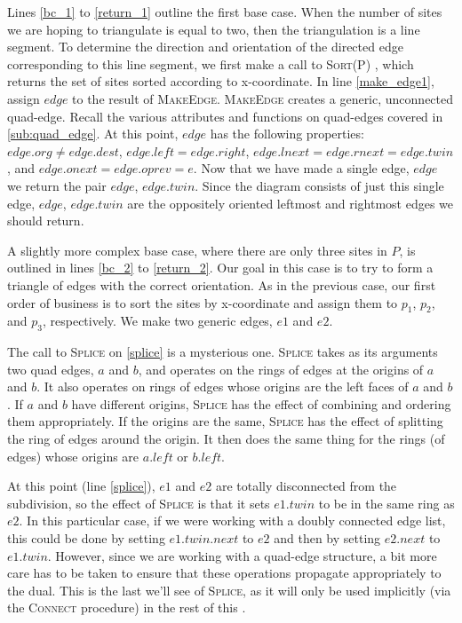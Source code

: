 \documentclass[12pt,twoside]{reedthesis}
\begin{document}
    Lines \ref{bc_1} to \ref{return_1} outline the first base case. When the number of sites we are hoping to triangulate is equal to two, then the triangulation is a line segment. To determine the direction and orientation of the directed edge corresponding to this line segment, we first make a call to \textsc{Sort}(P) , which returns the set of sites sorted according to x-coordinate. In line \ref{make_edge1}, assign $edge$ to the result of \textsc{MakeEdge}. \textsc{MakeEdge} creates a generic, unconnected quad-edge. Recall the various attributes and functions on quad-edges covered in \cref{sub:quad_edge}. At this point, $edge$ has the following properties: $edge.org \neq edge.dest$, $edge.left = edge.right$, $edge.lnext = edge.rnext = edge.twin$, and $edge.onext = edge.oprev = e$. Now that we have made a single edge, $edge$ we return the pair $edge$, $edge.twin$. Since the diagram consists of just this single edge, $edge$, $edge.twin$ are the oppositely oriented leftmost and rightmost edges we should return.

    A slightly more complex base case, where there are only three sites in $P$, is outlined in lines \ref{bc_2} to \ref{return_2}. Our goal in this case is to try to form a triangle of edges with the correct orientation.  As in the previous case, our first order of business is to sort the sites by x-coordinate and assign them to $p_{1}$, $p_{2}$, and $p_{3}$, respectively. We make two generic edges, $e1$ and $e2$. \par

    The call to \textsc{Splice} on \ref{splice} is a mysterious one. \textsc{Splice} takes as its arguments two quad edges, $a$ and $b$, and operates on the rings of edges at the origins of $a$ and $b$. It also operates on rings of edges whose origins are the left faces of $a$ and $b$. If $a$ and $b$ have different origins, \textsc{Splice} has the effect of combining and ordering them appropriately. If the origins are the same, \textsc{Splice} has the effect of splitting the ring of edges around the origin. It then does the same thing for the rings (of edges) whose origins are $a.left$ or $b.left$. \par

    At this point (line \ref{splice}), $e1$ and $e2$ are totally disconnected from the subdivision, so the effect of \textsc{Splice} is that it sets $e1.twin$ to be in the same ring as $e2$. In this particular case, if we were working with a doubly connected edge list, this could be done by setting $e1.twin.next$ to $e2$ and then by setting $e2.next$ to $e1.twin$. However, since we are working with a quad-edge structure, a bit more care has to be taken to ensure that these operations propagate appropriately to the dual. This is the last we'll see of \textsc{Splice}, as it will only be used implicitly (via the \textsc{Connect} procedure) in the rest of this .\par
\end{document}
